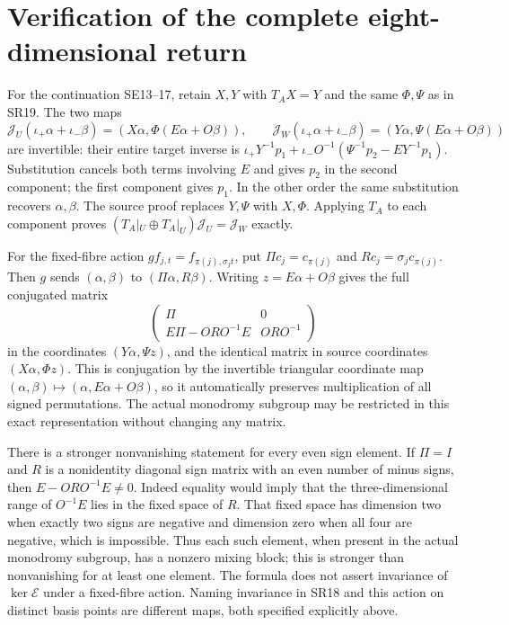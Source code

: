 \documentclass[11pt]{article}
\begin{document}
\section{Verification of the complete eight-dimensional return}
For the continuation SE13--17, retain $X,Y$ with $T_AX=Y$ and
the same $\Phi,\Psi$ as in SR19. The two maps
\[
 \mathcal J_U(\iota_+\alpha+\iota_-\beta)
 =(X\alpha,\Phi(E\alpha+O\beta)),\qquad
 \mathcal J_W(\iota_+\alpha+\iota_-\beta)
 =(Y\alpha,\Psi(E\alpha+O\beta))
 \tag{SR21}
\]
are invertible: their entire target inverse is
$\iota_+Y^{-1}p_1+\iota_-O^{-1}(\Psi^{-1}p_2-EY^{-1}p_1)$.
Substitution cancels both terms involving $E$ and gives $p_2$
in the second component; the first component gives $p_1$.
In the other order the same substitution recovers $\alpha,\beta$.
The source proof replaces $Y,\Psi$ with $X,\Phi$. Applying $T_A$
to each component proves $(T_A|_U\oplus T_A|_U)\mathcal J_U
=\mathcal J_W$ exactly.

For the fixed-fibre action
$g f_{j,t}=f_{\pi(j),\sigma_jt}$, put
$\Pi c_j=c_{\pi(j)}$ and $R c_j=\sigma_jc_{\pi(j)}$.
Then $g$ sends $(\alpha,\beta)$ to $(\Pi\alpha,R\beta)$.
Writing $z=E\alpha+O\beta$ gives the full conjugated matrix
\[
 \begin{pmatrix}\Pi&0\\E\Pi-ORO^{-1}E&ORO^{-1}\end{pmatrix}
 \tag{SR22}
\]
in the coordinates $(Y\alpha,\Psi z)$, and the identical
matrix in source coordinates $(X\alpha,\Phi z)$. This is
conjugation by the invertible triangular coordinate map
$(\alpha,\beta)\mapsto(\alpha,E\alpha+O\beta)$, so it
automatically preserves multiplication of all signed
permutations. The actual monodromy subgroup may be restricted
in this exact representation without changing any matrix.

There is a stronger nonvanishing statement for every even sign
element. If $\Pi=I$ and $R$ is a nonidentity diagonal sign
matrix with an even number of minus signs, then
$E-ORO^{-1}E\ne0$. Indeed equality would imply that the
three-dimensional range of $O^{-1}E$ lies in the fixed space
of $R$. That fixed space has dimension two when exactly two
signs are negative and dimension zero when all four are
negative, which is impossible. Thus each such element, when
present in the actual monodromy subgroup, has a nonzero
mixing block; this is stronger than nonvanishing for at least
one element. The formula does not assert invariance of
$\ker\mathcal E$ under a fixed-fibre action. Naming invariance
in SR18 and this action on distinct basis points are different
maps, both specified explicitly above.
\end{document}
